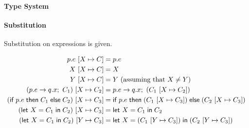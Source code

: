 \documentclass{article}
\theoremstyle{definition}
\newcommand{\bool}{\mathbbm{2}}
\newcommand{\subst}[3]{#1~[#2 \mapsto #3]}
\newcommand{\own}[2]{#1.#2}
\newcommand{\send}[3][]{#2\nolinebreak \mathrel{\xrightarrow{#1}}\nolinebreak #3}
\newcommand{\cif}[3]{\textsf{if}~#1 \mathrel{\textsf{then}}\nolinebreak #2 \mathrel{\textsf{else}}\nolinebreak #3}
\newcommand{\clet}[2]{\textsf{let}~#1\nolinebreak =\nolinebreak #2 \mathrel{\textsf{in}}}
\newcommand{\eppctxt}[2]{\llparenthesis #1 \rrparenthesis_{#2}}
\newcommand{\proves}[1][]{\sststile{}{#1}}
\begin{document}
\paragraph{Type System}
\noindent{}

\paragraph{Substitution}

\noindent Substitution on expressions is given.

\begin{align*}
  \subst{p.e}{X}{C} &= p.e \\
  \subst{X}{X}{C} &= X \\
  \subst{Y}{X}{C} &= Y~\text{(assuming that $X \neq Y$)} \\
  \subst{(\send{\own{p}{e}}{\own{q}{x}};~C_1)}{X}{C_2} &= \send{\own{p}{e}}{\own{q}{x}};~(\subst{C_1}{X}{C_2}) \\
  \subst{(\cif{\own{p}{e}}{C_1}{C_2})}{X}{C_3} &= \cif{\own{p}{e}}{(\subst{C_1}{X}{C_3})}{(\subst{C_2}{X}{C_3})}\\
  \subst{(\clet{X}{C_1}{C_2})}{X}{C_3} &= \clet{X}{C_1}{C_2}\\
  \subst{(\clet{X}{C_1}{C_2})}{Y}{C_3} &= \clet{X}{(\subst{C_1}{Y}{C_3})}{(\subst{C_2}{Y}{C_3})}
\end{align*}
\end{document}
